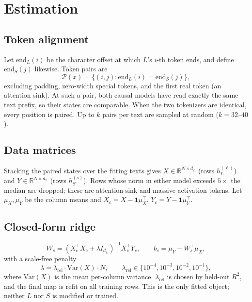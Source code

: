 \documentclass[10pt]{article}
\newcommand{\R}{\mathbb{R}}
\newcommand{\hL}{h_L^{(\ell)}}
\newcommand{\hS}{h_S^{(s)}}
\begin{document}
\section{Estimation}

\subsection{Token alignment}\label{sec:align}
Let $\mathrm{end}_L(i)$ be the character offset at which $L$'s $i$-th token ends, and define
$\mathrm{end}_S(j)$ likewise. Token pairs are
\begin{equation}
\mathcal{P}(x) = \{(i,j) : \mathrm{end}_L(i) = \mathrm{end}_S(j)\},
\end{equation}
excluding padding, zero-width special tokens, and the first real token (an attention sink). At such a pair,
both causal models have read exactly the same text prefix, so their states are comparable. When the two
tokenizers are identical, every position is paired. Up to $k$ pairs per text are sampled at random
($k=32$--$40$).

\subsection{Data matrices}
Stacking the paired states over the fitting texts gives $X\in\R^{N\times d_L}$ (rows $\hL$) and
$Y\in\R^{N\times d_S}$ (rows $\hS$). Rows whose norm in either model exceeds $5\times$ the median are
dropped; these are attention-sink and massive-activation tokens. Let $\mu_X,\mu_Y$ be the column means and
$X_c = X - \mathbf{1}\mu_X^\top$, $Y_c = Y - \mathbf{1}\mu_Y^\top$.

\subsection{Closed-form ridge}
\begin{equation}
W_s = \left(X_c^\top X_c + \lambda I_{d_L}\right)^{-1} X_c^\top Y_c, \qquad
b_s = \mu_Y - W_s^\top \mu_X,
\label{eq:ridge}
\end{equation}
with a scale-free penalty
\begin{equation}
\lambda = \lambda_{\mathrm{rel}} \cdot \overline{\mathrm{Var}}(X)\cdot N, \qquad
\lambda_{\mathrm{rel}} \in \{10^{-4}, 10^{-3}, 10^{-2}, 10^{-1}\},
\end{equation}
where $\overline{\mathrm{Var}}(X)$ is the mean per-column variance. $\lambda_{\mathrm{rel}}$ is chosen by
held-out $R^2$, and the final map is refit on all training rows. This is the only fitted object; neither
$L$ nor $S$ is modified or trained.
\end{document}
